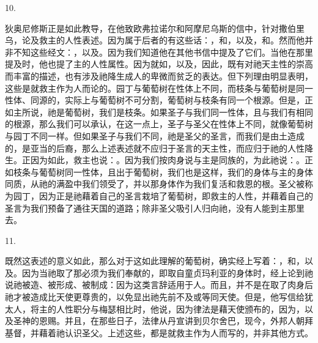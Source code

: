 10. \par

狄奥尼修斯正是如此教导，在他致欧弗拉诺尔和阿摩尼乌斯的信中，针对撒伯里乌，论及救主的人性表述。因为属于后者的有这些话：，和，以及，和。然而他并非不知这些经文：，以及。因为我们知道他在其他书信中提及了它们。当他在那里提及时，他也提了主的人性属性。因为就如，以及，因此，既有对祂天主性的崇高而丰富的描述，也有涉及祂降生成人的卑微而贫乏的表达。但下列理由明显表明，这些是就救主作为人而论的。园丁与葡萄树在性体上不同，而枝条与葡萄树是同一性体、同源的，实际上与葡萄树不可分割，葡萄树与枝条有同一个根源。但是，正如主所说，祂是葡萄树，我们是枝条。如果圣子与我们同一性体，且与我们有相同的根源，那么我们可以承认，在这一点上，圣子与圣父在性体上不同，就像葡萄树与园丁不同一样。但如果圣子与我们不同，祂是圣父的圣言，而我们是由土造成的，是亚当的后裔，那么上述表述就不应归于圣言的天主性，而应归于祂的人性降生。正因为如此，救主也说：。因为我们按肉身说与主是同族的，为此祂说：。正如枝条与葡萄树同一性体，且出于葡萄树，我们也是这样，我们的身体与主的身体同质，从祂的满盈中我们领受了，并以那身体作为我们复活和救恩的根。圣父被称为园丁，因为正是祂藉着自己的圣言栽培了葡萄树，即救主的人性，并藉着自己的圣言为我们预备了通往天国的道路；除非圣父吸引人归向祂，没有人能到主那里去。\par

11. \par

既然这表述的意义如此，那么对于这如此理解的葡萄树，确实经上写着：，和，以及。因为当祂取了那必须为我们奉献的，即取自童贞玛利亚的身体时，经上论到祂说祂被造、被形成、被制成：因为这类言辞适用于人。而且，并不是在取了肉身后祂才被造成比天使更尊贵的，以免显出祂先前不及或等同天使。但是，他写信给犹太人，将主的人性职分与梅瑟相比时，他说，因为律法是藉天使颁布的，因为，以及圣神的恩赐。并且，在那些日子，法律从丹宣讲到贝尔舍巴，现今，外邦人朝拜基督，并藉着祂认识圣父。上述这些，都是就救主作为人而写的，并非其他方式。\par

